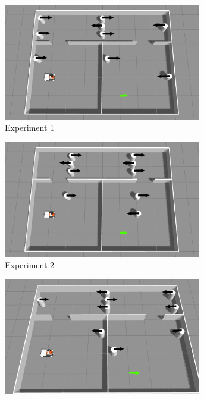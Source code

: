 \begin{figure}[H]
    \centering
    \begin{subfigure}[b]{0.50\linewidth}
        \centering
        \includegraphics[width=0.95\textwidth]{images/test_case_3/exp1.png}
        \caption{Experiment 1}
    \end{subfigure}%
    \begin{subfigure}[b]{0.50\linewidth}
        \centering
        \includegraphics[width=0.95\textwidth]{images/test_case_3/exp2.png}
        \caption{Experiment 2}
    \end{subfigure}
    \begin{subfigure}[b]{0.50\linewidth}
        \centering
        \includegraphics[width=0.95\textwidth]{images/test_case_3/exp3.png}

\end{subfigure}
\end{figure}
